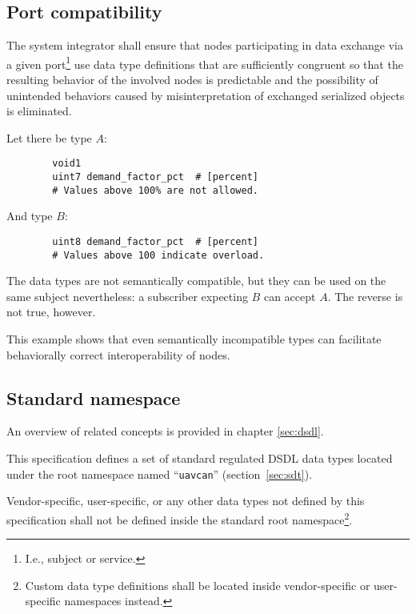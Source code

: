 \subsection{Port compatibility}


The system integrator shall ensure that nodes participating in data exchange via a given port\footnote{%
    I.e., subject or service.
} use data type definitions that are sufficiently congruent so that the resulting behavior of the involved nodes
is predictable and the possibility of unintended behaviors caused by misinterpretation of exchanged serialized
objects is eliminated.

\begin{remark}
    Let there be type $A$:

    \begin{verbatim}
        void1
        uint7 demand_factor_pct  # [percent]
        # Values above 100% are not allowed.
    \end{verbatim}

    And type $B$:

    \begin{verbatim}
        uint8 demand_factor_pct  # [percent]
        # Values above 100 indicate overload.
    \end{verbatim}

    The data types are not semantically compatible, but they can be used on the same subject nevertheless:
    a subscriber expecting $B$ can accept $A$.
    The reverse is not true, however.

    This example shows that even semantically incompatible types can facilitate
    behaviorally correct interoperability of nodes.
\end{remark}

\subsection{Standard namespace}

An overview of related concepts is provided in chapter \ref{sec:dsdl}.

This specification defines a set of standard regulated DSDL data types located under
the root namespace named ``\verb"uavcan"'' (section~\ref{sec:sdt}).

Vendor-specific, user-specific, or any other data types not defined by this specification
shall not be defined inside the standard root namespace\footnote{Custom data type definitions shall be located
inside vendor-specific or user-specific namespaces instead.}.
